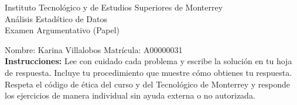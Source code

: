 \documentclass[10pt]{report}
\begin{document}
\newpage



\begin{center}
{\large Instituto Tecnol\'{o}gico y de Estudios Superiores de Monterrey \\
An\'alisis Estad\'stico de Datos } \\
Examen Argumentativo (Papel)
\end{center}

Nombre: \underline{\hspace*{.2in}}
Karina Villalobos
\underline{\hspace*{.2in}} \quad Matr\'icula:\underline{\hspace*{.2in}}
A00000031
\underline{\hspace*{.2in}} \\

{\bf Instrucciones:} Lee con cuidado cada problema y escribe la soluci\'on
en tu hoja de respuesta. Incluye tu procedimiento que muestre c\'omo obtienes tu respuesta.  Respeta el c\'odigo de \'etica del curso y del Tecnol\'ogico de Monterrey y responde los ejercicios de manera individual sin ayuda externa o no autorizada.
\end{document}
